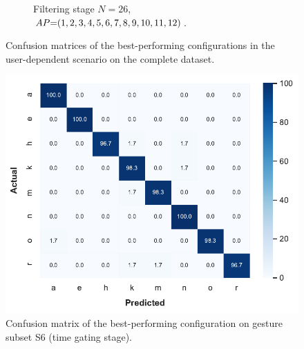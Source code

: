 \begin{figure}
\begin{subfigure}{.69\linewidth}
        \vspace{-12pt}
        \caption{Filtering stage $N{=}26$, \\ $\splitatcommas{AP{=}(1, 2, 3, 4, 5, 6, 7, 8, 9, 10, 11, 12)}$.}
        \label{fig:radar-experiments:confusion-exp1-UD-filtering}
    \end{subfigure}
    \caption{Confusion matrices of the best-performing configurations in the user-dependent scenario on the complete dataset.}
    \label{fig:radar-experiments:confusion-exp1-UD}
    \vspace{-20pt}
\end{figure}

\begin{figure}
    \centering
    \includegraphics[width=.72\linewidth]{Figures/RadarExperiments/Datasets/20Gestures/Results/1_4_7_8_10_14_18_19/1f-cm.pdf}
    \caption{Confusion matrix of the best-performing configuration on gesture subset S6 (time gating stage).}
    \label{fig:confusion-exp2-S6}
\end{figure}


